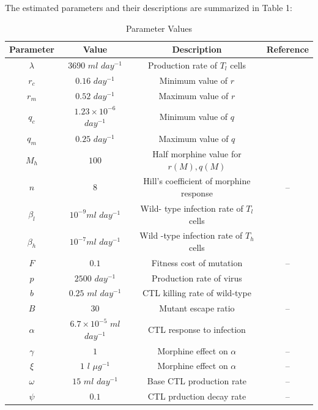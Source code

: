 \documentclass[11pt, oneside]{article}    %
\begin{document}
\vspace{5mm}

	The estimated parameters and their descriptions are summarized in Table 1:

\begin{table}[H]
\centering
\caption{Parameter Values}
\vspace{3mm}
\begin{tabular}{|c|c|c|c|}
\hline
Parameter & Value & Description & Reference\\
\hline
$\lambda$ & 3690 $ml$ $day^{-1}$ & Production rate of $T_l$ cells & \cite{Vaidya}\\
\hline
$r_c$ & $0.16$ $day^{-1}$& Minimum value of $r$ &  \cite{Vaidya}\\
\hline
$r_m$ & $0.52$ $day^{-1}$ & Maximum value of $r$ & \cite{Vaidya}\\
\hline
$q_c$ & $1.23 \times 10^{-6}$  $day^{-1}$ & Minimum value of $q$ & \cite{Vaidya}\\
\hline
$q_m$ & $0.25$ $day^{-1}$ & Maximum value of $q$ & \cite{Vaidya}\\
\hline
$M_h$ & $100$ &  Half morphine value for $r(M),q(M)$  & \cite{Olkkola} \\
\hline
$n$ & $8$ &  Hill's coefficient of morphine response  & --\\
\hline
$\beta_l$ & $10^{-9} ml$ $day^{-1}$ & Wild- type infection rate of $T_l$ cells & \cite{Vaidya}\\
\hline
$\beta_h$ & $10^{-7} ml$ $day^{-1}$ & Wild -type infection rate of $T_h$ cells & \cite{Vaidya} \\
\hline
$F$ & $0.1$ & Fitness cost of mutation & --\\
\hline
$p$ & $2500$ $day^{-1}$ & Production rate of virus & \cite{Vaidya} \\
\hline
$b$ & $0.25$ $ml$ $day^{-1}$ & CTL killing rate of wild-type & \cite{Ganusov2011}\\
\hline
$B$ & $30$ & Mutant escape ratio & --\\
\hline 
$\alpha$ & $6.7 \times 10^{-5}$ $ml$ $day^{-1}$ & CTL response to infection & \cite{De Boer}\\
\hline
$\gamma$ & $1$ & Morphine effect on $\alpha$ & --\\
\hline
$\xi$ & $1$ $l$ $\mu g ^{-1}$ & Morphine effect on $\alpha$ & --\\
\hline
$\omega$ & $15$ $ml$ $day^{-1}$  & Base CTL production rate & --\\
\hline
$\psi$ & $0.1$ & CTL prduction decay rate & --\\

\end{tabular}
\end{table}
\end{document}
